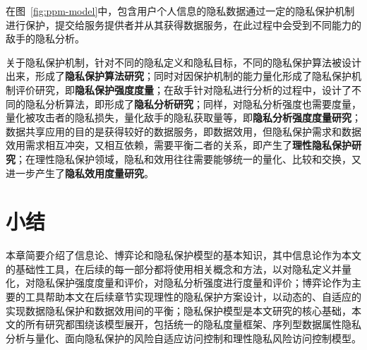在图~\ref{fig:ppm-model}中，包含用户个人信息的隐私数据通过一定的隐私保护机制进行保护，提交给服务提供者并从其获得数据服务，在此过程中会受到不同能力的敌手的隐私分析。

关于隐私保护机制，针对不同的隐私定义和隐私目标，不同的隐私保护算法被设计出来，形成了\textbf{隐私保护算法研究}；同时对因保护机制的能力量化形成了隐私保护机制评价研究，即\textbf{隐私保护强度度量}；在敌手针对隐私进行分析的过程中，设计了不同的隐私分析算法，即形成了\textbf{隐私分析研究}；同样，对隐私分析强度也需要度量，量化被攻击者的隐私损失，量化敌手的隐私获取量等，即\textbf{隐私分析强度度量研究}；数据共享应用的目的是获得较好的数据服务，即数据效用，但隐私保护需求和数据效用需求相互冲突，又相互依赖，需要平衡二者的关系，即产生了\textbf{理性隐私保护研究}；在理性隐私保护领域，隐私和效用往往需要能够统一的量化、比较和交换，又进一步产生了\textbf{隐私效用度量研究}。

\section{小结}

本章简要介绍了信息论、博弈论和隐私保护模型的基本知识，其中信息论作为本文的基础性工具，在后续的每一部分都将使用相关概念和方法，以对隐私定义并量化，对隐私保护强度度量和评价，对隐私分析强度进行度量和评价；博弈论作为主要的工具帮助本文在后续章节实现理性的隐私保护方案设计，以动态的、自适应的实现数据隐私保护和数据效用间的平衡；隐私保护模型是本文研究的核心基础，本文的所有研究都围绕该模型展开，包括统一的隐私度量框架、序列型数据属性隐私分析与量化、面向隐私保护的风险自适应访问控制和理性隐私风险访问控制模型。